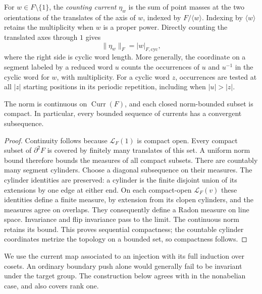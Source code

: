 For $w\in F\setminus\{1\}$, the \emph{counting current} $\eta_w$
is the sum of point masses at the two orientations of the translates
of the axis of $w$, indexed by $F/\langle w\rangle$.  Indexing by
$\langle w\rangle$ retains the multiplicity when $w$ is a proper
power.  Directly counting the translated axes through $1$ gives
\begin{equation}
 \|\eta_w\|_F=|w|_{F,\mathrm{cyc}},
 \label{ann:counting-norm}
\end{equation}
where the right side is cyclic word length.  More generally, the
coordinate on a segment labeled by a reduced word $u$ counts the
occurrences of $u$ and $u^{-1}$ in the cyclic word for $w$, with
multiplicity.  For a cyclic word $z$, occurrences are tested at all
$|z|$ starting positions in its periodic repetition, including when
$|u|>|z|$.

\begin{lemma}[Compactness]
\label{ann:current-compactness}
The norm is continuous on $\operatorname{Curr}(F)$, and each closed
norm-bounded subset is compact.  In particular, every bounded sequence
of currents has a convergent subsequence.
\end{lemma}

\begin{proof}
Continuity follows because $\mathcal L_F(1)$ is compact open.  Every
compact subset of $\partial^2F$ is covered by finitely many translates
of this set.  A uniform norm bound therefore bounds the measures of
all compact subsets.  There are countably many segment cylinders.
Choose a diagonal subsequence on their measures.  The cylinder
identities are preserved: a cylinder is the finite disjoint union of
its extensions by one edge at either end.  On each compact-open
$\mathcal L_F(v)$ these identities define a finite measure, by
extension from its clopen cylinders, and the measures agree on
overlaps.  They consequently define a Radon measure on line space.
Invariance and flip invariance pass to the limit.  The continuous
norm retains its bound.  This proves sequential compactness; the
countable cylinder coordinates metrize the topology on a bounded
set, so compactness follows.
\end{proof}

We use the current map associated to an injection with its full
induction over cosets.  An ordinary boundary push alone would generally
fail to be invariant under the target group.  The construction below
agrees with \cite[Proposition--Definition~12.1]{KapovichCurrents2006}
in the nonabelian case, and also covers rank one.

